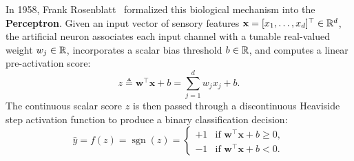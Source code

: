 In 1958, Frank Rosenblatt~\cite{rosenblatt1958perceptron} formalized this biological mechanism into the \textbf{Perceptron}. Given an input vector of sensory features $\mathbf{x} = [x_1, \dots, x_d]^\top \in \mathbb{R}^d$, the artificial neuron associates each input channel with a tunable real-valued weight $w_j \in \mathbb{R}$, incorporates a scalar bias threshold $b \in \mathbb{R}$, and computes a linear pre-activation score:
\begin{equation}
z \triangleq \mathbf{w}^\top \mathbf{x} + b = \sum_{j=1}^d w_j x_j + b.
\label{eq:perceptron_preactivation}
\end{equation}
The continuous scalar score $z$ is then passed through a discontinuous Heaviside step activation function to produce a binary classification decision:
\begin{equation}
\hat{y} = f(z) = \operatorname{sgn}(z) = \begin{cases} +1 & \text{if } \mathbf{w}^\top \mathbf{x} + b \ge 0, \\ -1 & \text{if } \mathbf{w}^\top \mathbf{x} + b < 0. \end{cases}
\label{eq:perceptron_activation}
\end{equation}

